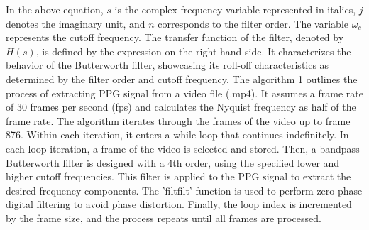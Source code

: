 \documentclass[journal,twoside,web]{ieeecolor}
\begin{document}
In the above equation, \( s \) is the complex frequency variable represented in italics, \( j \) denotes the imaginary unit, and \( n \) corresponds to the filter order. The variable \( \omega_c \) represents the cutoff frequency. The transfer function of the filter, denoted by \( H(s) \), is defined by the expression on the right-hand side. It characterizes the behavior of the Butterworth filter, showcasing its roll-off characteristics as determined by the filter order and cutoff frequency.
The algorithm 1 outlines the process of extracting PPG signal from a video file (.mp4). It assumes a frame rate of 30 frames per second (fps) and calculates the Nyquist frequency as half of the frame rate. The algorithm iterates through the frames of the video up to frame 876. Within each iteration, it enters a while loop that continues indefinitely. In each loop iteration, a frame of the video is selected and stored. Then, a bandpass Butterworth filter is designed with a 4th order, using the specified lower and higher cutoff frequencies. This filter is applied to the PPG signal to extract the desired frequency components. The 'filtfilt' function is used to perform zero-phase digital filtering to avoid phase distortion. Finally, the loop index is incremented by the frame size, and the process repeats until all frames are processed.
\\
\end{document}
